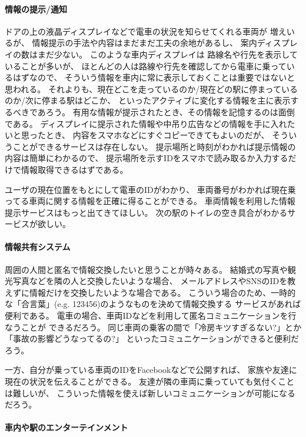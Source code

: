 \documentclass[twocolumn,10pt]{jarticle}
\begin{document}
\paragraph{情報の提示/通知}

ドアの上の液晶ディスプレイなどで電車の状況を知らせてくれる車両が
増えいるが、 情報提示の手法や内容はまだまだ工夫の余地があるし、
案内ディスプレイの数はまだ少ない。
このような車内ディスプレイは
路線名や行先を表示していることが多いが、
ほとんどの人は路線や行先を確認してから電車に乗っているはずなので、
そういう情報を車内に常に表示しておくことは重要ではないと思われる。
それよりも、現在どこを走っているのか/現在どの駅に停まっているのか/次に停まる駅はどこか、
といったアクティブに変化する情報を主に表示するべきであろう。
有用な情報が提示されたとき、その情報を記憶するのは面倒である。
ディスプレイに提示された情報や中吊り広告などの情報を手に入れたいと思ったとき、
内容をスマホなどにすぐコピーできてもよいのだが、
そういうことができるサービスは存在しない。
提示場所と時刻がわかれば提示情報の内容は簡単にわかるので、
提示場所を示すIDをスマホで読み取るか入力するだけで情報取得できるはずである。

ユーザの現在位置をもとにして電車のIDがわかり、
車両番号がわかれば現在乗ってる車両に関する情報を正確に得ることができる。
車両情報を利用した情報提示サービスはもっと出てきてほしい。
次の駅のトイレの空き具合がわかるサービスが欲しい。

\paragraph{情報共有システム}
  
周囲の人間と匿名で情報交換したいと思うことが時々ある。
結婚式の写真や観光写真などを隣の人と交換したいような場合、
メールアドレスやSNSのIDを教えずに情報だけを交換したいような場合である。
こういう場合のため、一時的な「合言葉」(e.g. 123456)のようなものを決めて情報交換する
サービスがあれば便利である。
電車の場合、車両IDなどを利用して匿名コミュニケーションを行なうことが
できるだろう。
同じ車両の乗客の間で「冷房キツすぎるない?」とか「事故の影響どうなってるの?」
といったコミュニケーションができると便利だろう。

一方、自分が乗っている車両のIDをFacebookなどで公開すれば、
家族や友達に現在の状況を伝えることができる。
友達が隣の車両に乗っていても気付くことは難しいが、
こういった情報を使えば新しいコミュニケーションが可能になるだろう。

\paragraph{車内や駅のエンターテインメント}
  
\end{document}
